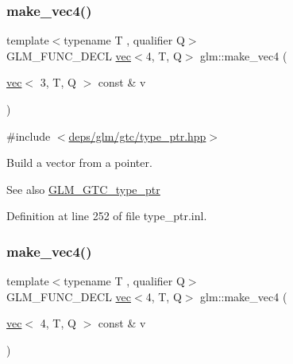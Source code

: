 \subsubsection{\texorpdfstring{make\+\_\+vec4()}{make\_vec4()}\hspace{0.1cm}{\footnotesize\ttfamily [3/5]}}
{\footnotesize\ttfamily template$<$typename T , qualifier Q$>$ \\
G\+L\+M\+\_\+\+F\+U\+N\+C\+\_\+\+D\+E\+CL \hyperlink{structglm_1_1vec}{vec}$<$4, T, Q$>$ glm\+::make\+\_\+vec4 (\begin{DoxyParamCaption}\item[{\hyperlink{structglm_1_1vec}{vec}$<$ 3, T, Q $>$ const \&}]{v }\end{DoxyParamCaption})\hspace{0.3cm}{\ttfamily [inline]}}



{\ttfamily \#include $<$\hyperlink{type__ptr_8hpp}{deps/glm/gtc/type\+\_\+ptr.\+hpp}$>$}

Build a vector from a pointer. \begin{DoxySeeAlso}{See also}
\hyperlink{group__gtc__type__ptr}{G\+L\+M\+\_\+\+G\+T\+C\+\_\+type\+\_\+ptr} 
\end{DoxySeeAlso}


Definition at line 252 of file type\+\_\+ptr.\+inl.

\mbox{\label{group__gtc__type__ptr_gaa95cb15732f708f613e65a0578895ae5}} 
\subsubsection{\texorpdfstring{make\+\_\+vec4()}{make\_vec4()}\hspace{0.1cm}{\footnotesize\ttfamily [4/5]}}
{\footnotesize\ttfamily template$<$typename T , qualifier Q$>$ \\
G\+L\+M\+\_\+\+F\+U\+N\+C\+\_\+\+D\+E\+CL \hyperlink{structglm_1_1vec}{vec}$<$4, T, Q$>$ glm\+::make\+\_\+vec4 (\begin{DoxyParamCaption}\item[{\hyperlink{structglm_1_1vec}{vec}$<$ 4, T, Q $>$ const \&}]{v }\end{DoxyParamCaption})\hspace{0.3cm}{\ttfamily [inline]}}



